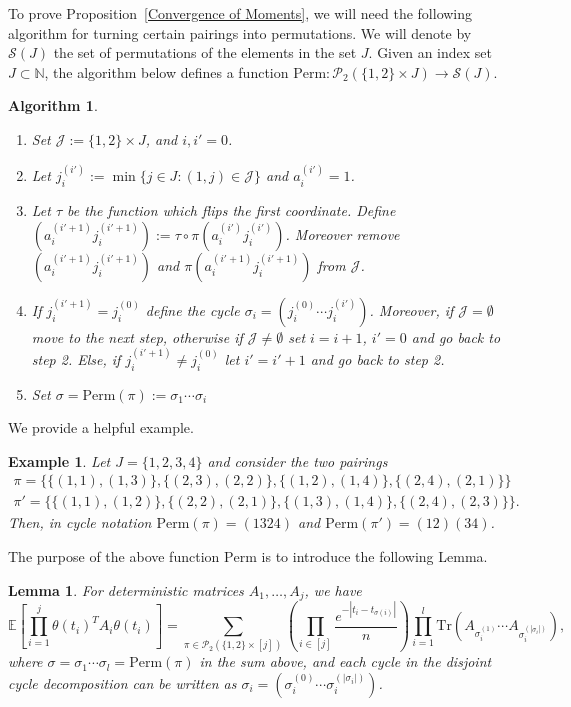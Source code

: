 \documentclass{amsart}
\newtheorem{lm}[thm]{Lemma}
\newtheorem{ex}[thm]{Example}
\newtheorem{alg}[thm]{Algorithm}
\numberwithin{equation}{section}
\newcommand{\E}{\mathbb{E}}
\begin{document}
To prove Proposition~\ref{Convergence of Moments}, we will need the following algorithm for turning certain pairings into permutations. We will denote by $\mathcal{S}(J)$ the set of permutations of the elements in the set $J$. Given an index set $J \subset \mathbb{N}$, the algorithm below defines a function $\mathrm{Perm}:\mathcal{P}_2(\{1,2\} \times J) \to  \mathcal{S}(J)$.    
\begin{alg}\,
    \begin{enumerate}
        \item Set $\mathcal{J}:= \{1,2\} \times  J $, and $i,i'=0$.
        \item Let $j_i^{(i')} := \min \{j \in J: (1,j) \in \mathcal{J}  \}$ and $a_i^{(i')}=1$. 
        \item Let $\tau$ be the function which flips the first coordinate. Define $(a_i^{(i'+1)}j_i^{(i'+1)}):=\tau \circ \pi (a_i^{(i')}j_i^{(i')})$. Moreover remove $(a_i^{(i'+1)}j_i^{(i'+1)})$ and $\pi(a_i^{(i'+1)}j_i^{(i'+1)})$ from $\mathcal{J}$.
        \item If $j_i^{(i'+1)}=j_i^{(0)}$ define the cycle $\sigma_i = (j_i^{(0)}\cdots j_i^{(i')})$. Moreover, if $\mathcal{J}=\emptyset$ move to the next step, otherwise if $\mathcal{J}\neq \emptyset$ set $i = i+1$, $i'=0$ and go back to step 2. Else, if $j_i^{(i'+1)}\neq j_i^{(0)}$ let $i' =i'+1$ and go back to step 2.
        \item Set $\sigma = \mathrm{Perm}(\pi):= \sigma_1\cdots\sigma_i$
    \end{enumerate}
\end{alg}

We provide a helpful example. 
\begin{ex}
    Let $J=\{1,2,3,4\}$ and consider the two pairings
    \begin{equation*}
        \begin{split}
            \pi = \{\{(1,1),(1,3)\},\{(2,3),(2,2)\}, \{(1,2),(1,4)\},\{(2,4),(2,1)\}\}\\
            \pi' = \{\{(1,1),(1,2)\},\{(2,2),(2,1)\}, \{(1,3),(1,4)\},\{(2,4),(2,3)\}\}.
        \end{split}
    \end{equation*}
    Then, in cycle notation $\mathrm{Perm}(\pi) = (1 3 2 4)$ and $\mathrm{Perm}(\pi') = (1 2 ) (3 4)$. 
\end{ex}

The purpose of the above function $\mathrm{Perm}$ is to introduce the following Lemma. 
\begin{lm}\label{Perm Expansion}
    For deterministic matrices $A_1,\dots ,A_j$, we have
    \begin{equation*}
        \E\left[\prod_{i=1}^{j}\theta(t_i)^T A_i \theta(t_i)\right] = \sum_{\pi \in \mathcal{P}_2(\{1,2\} \times [j])} \left(\prod_{i \in [j]} \frac{e^{-|t_i-t_{\sigma(i)}|}}{n}\right)\prod_{i=1}^{l}\mathrm{Tr}\left(A_{\sigma_i^{(1)}}\cdots A_{\sigma_i^{(|\sigma_i|)}}\right),
    \end{equation*}
    where $\sigma = \sigma_1\cdots \sigma_l = \mathrm{Perm}(\pi)$ in the sum above, and each cycle in the disjoint cycle decomposition can be written as $\sigma_i = (\sigma_i^{(0)}\cdots \sigma_i^{(|\sigma_i|)})$.
\end{lm}
\end{document}
